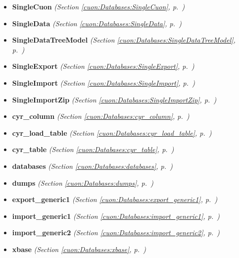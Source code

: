 \begin{itemize}
\setlength{\parskip}{0ex}
\item \textbf{SingleCuon}
  \textit{(Section \ref{cuon:Databases:SingleCuon}, p.~\pageref{cuon:Databases:SingleCuon})}

\item \textbf{SingleData}
  \textit{(Section \ref{cuon:Databases:SingleData}, p.~\pageref{cuon:Databases:SingleData})}

\item \textbf{SingleDataTreeModel}
  \textit{(Section \ref{cuon:Databases:SingleDataTreeModel}, p.~\pageref{cuon:Databases:SingleDataTreeModel})}

\item \textbf{SingleExport}
  \textit{(Section \ref{cuon:Databases:SingleExport}, p.~\pageref{cuon:Databases:SingleExport})}

\item \textbf{SingleImport}
  \textit{(Section \ref{cuon:Databases:SingleImport}, p.~\pageref{cuon:Databases:SingleImport})}

\item \textbf{SingleImportZip}
  \textit{(Section \ref{cuon:Databases:SingleImportZip}, p.~\pageref{cuon:Databases:SingleImportZip})}

\item \textbf{cyr\_column}
  \textit{(Section \ref{cuon:Databases:cyr_column}, p.~\pageref{cuon:Databases:cyr_column})}

\item \textbf{cyr\_load\_table}
  \textit{(Section \ref{cuon:Databases:cyr_load_table}, p.~\pageref{cuon:Databases:cyr_load_table})}

\item \textbf{cyr\_table}
  \textit{(Section \ref{cuon:Databases:cyr_table}, p.~\pageref{cuon:Databases:cyr_table})}

\item \textbf{databases}
  \textit{(Section \ref{cuon:Databases:databases}, p.~\pageref{cuon:Databases:databases})}

\item \textbf{dumps}
  \textit{(Section \ref{cuon:Databases:dumps}, p.~\pageref{cuon:Databases:dumps})}

\item \textbf{export\_generic1}
  \textit{(Section \ref{cuon:Databases:export_generic1}, p.~\pageref{cuon:Databases:export_generic1})}

\item \textbf{import\_generic1}
  \textit{(Section \ref{cuon:Databases:import_generic1}, p.~\pageref{cuon:Databases:import_generic1})}

\item \textbf{import\_generic2}
  \textit{(Section \ref{cuon:Databases:import_generic2}, p.~\pageref{cuon:Databases:import_generic2})}

\item \textbf{xbase}
  \textit{(Section \ref{cuon:Databases:xbase}, p.~\pageref{cuon:Databases:xbase})}

\end{itemize}

